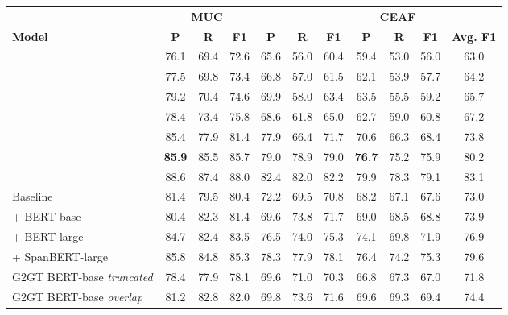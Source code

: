 \documentclass[11pt]{article}
\begin{document}
\begin{table*}[t]
	\centering
	\begin{adjustbox}{width=1\textwidth}
		\begin{tabular}{l c c c | c c c | c c c | c } 
			\toprule \
			& \multicolumn{3}{c}{\textbf{MUC}} & \multicolumn{3}{c}{} & \multicolumn{3}{c}{\textbf{CEAF}} \\ 
			\textbf{Model} & \textbf{P} & \textbf{R} & \textbf{F1} & \textbf{P} & \textbf{R} & \textbf{F1} & \textbf{P} & \textbf{R} & \textbf{F1} &\textbf{Avg. F1} \\ \hline
			\citet{clark-manning-2015-entity} & 76.1 & 69.4 & 72.6 & 65.6 & 56.0 & 60.4 & 59.4 & 53.0 & 56.0 & 63.0 \\ 
			\citet{wiseman-etal-2016-learning} & 77.5 & 69.8 & 73.4 & 66.8 & 57.0 & 61.5 & 62.1 & 53.9 & 57.7 & 64.2 \\
			\citet{clark-manning-2016-improving} & 79.2 & 70.4 & 74.6 & 69.9 & 58.0 & 63.4 & 63.5 & 55.5 & 59.2 & 65.7 \\
			\citet{lee-etal-2017-end} & 78.4 & 73.4 & 75.8 & 68.6 & 61.8 & 65.0 & 62.7 & 59.0 & 60.8 &  67.2  \\ 
			\citet{fei-etal-2019-end} & 85.4 & 77.9 & 81.4 & 77.9 & 66.4 & 71.7 & 70.6 & 66.3 & 68.4  & 73.8 \\ 
			\citet{xu-choi-2020-revealing} & \textbf{85.9} & 85.5 &85.7 &79.0 &78.9 &79.0 &\textbf{76.7}& 75.2& 75.9& 80.2 \\
			\citet{wu-etal-2020-corefqa} & {\color{gray}88.6} & {\color{gray}87.4} & {\color{gray}88.0} & {\color{gray}82.4}& {\color{gray}82.0} & {\color{gray}82.2} & {\color{gray}79.9} & {\color{gray}78.3} & {\color{gray}79.1}& {\color{gray}83.1} \\
			\hline
			Baseline \cite{lee-etal-2018-higher}   & 81.4 & 79.5 & 80.4 & 72.2 & 69.5 & 70.8 & 68.2 & 67.1 & 67.6 & 73.0 \\
			+ BERT-base \cite{joshi-etal-2019-bert}  & 80.4 & 82.3 & 81.4 & 69.6 & 73.8 & 71.7 & 69.0 & 68.5 & 68.8 & 73.9 \\
			+ BERT-large \cite{joshi-etal-2019-bert}  & 84.7 & 82.4 & 83.5 & 76.5 & 74.0 & 75.3 & 74.1 & 69.8 & 71.9 & 76.9 \\  
			+ SpanBERT-large \cite{joshi-etal-2020-spanbert} & 85.8 & 84.8 &85.3 &78.3 &77.9 &78.1& 76.4& 74.2 &75.3 &79.6 \\ \hline
			G2GT BERT-base \emph{truncated} & 78.4 & 77.9 & 78.1 & 69.6 & 71.0 & 70.3 & 66.8 & 67.3 & 67.0 & 71.8 \\
			G2GT BERT-base \emph{overlap} & 81.2 & 82.8 & 82.0 & 69.8 & 73.6 & 71.6 & 69.6 & 69.3 & 69.4 & 74.4 \\

\end{tabular}
\end{adjustbox}
\end{table*}
\end{document}
